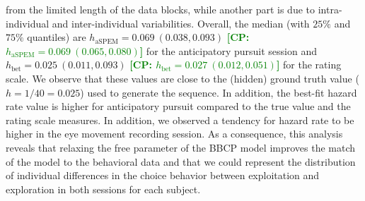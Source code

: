 \documentclass[10pt,letterpaper]{article}
\newcommand{\citep}[1]{\cite{#1}}
\newcommand{\LP}[1]{\textbf{\textcolor{red}{[LP: #1]}}}
\newcommand{\CP}[1]{\textbf{\textcolor{green}{[CP: #1]}}}
\begin{document}
from the limited length of the data blocks,
while another part is due to intra-individual and inter-individual variabilities.
Overall, the median (with $25\%$ and $75\%$ quantiles) are $h_{\text{aSPEM}} = 0.069 ~ (0.038, 0.093)$ %
\CP{$h_{\text{aSPEM}} = 0.069 ~ (0.065, 0.080)$}
for the anticipatory pursuit session and
$h_{\text{bet}} = 0.025 ~ (0.011, 0.093)$ %
\CP{$h_{\text{bet}} = 0.027 ~ (0.012, 0.051)$}
for the rating scale.
We observe that these values are close to the (hidden) ground truth value ($h=1/40=0.025$) used to generate the sequence.
In addition, the best-fit hazard rate value is higher for anticipatory pursuit compared to the true value and the rating scale measures.
In addition, we observed a tendency for hazard rate to be higher in the eye movement recording session.
As a consequence, this analysis reveals
that relaxing the free parameter of the BBCP model
improves the match of the model to the behavioral data and
that we could represent the distribution of individual differences in the choice behavior
between exploitation and exploration in both sessions for each subject.
\end{document}
